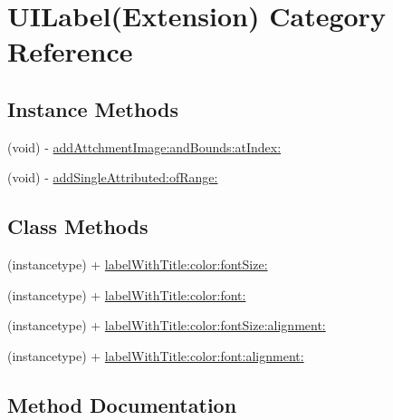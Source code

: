 \hypertarget{category_u_i_label_07_extension_08}{}\section{U\+I\+Label(Extension) Category Reference}
\label{category_u_i_label_07_extension_08}
\subsection*{Instance Methods}
\begin{DoxyCompactItemize}
\item 
(void) -\/ \mbox{\hyperlink{category_u_i_label_07_extension_08_a89c0591e6870f82316fc9ab7bcca537c}{add\+Attchment\+Image\+:and\+Bounds\+:at\+Index\+:}}
\item 
(void) -\/ \mbox{\hyperlink{category_u_i_label_07_extension_08_a24c98d97089aa3b852bb75a6cd16b880}{add\+Single\+Attributed\+:of\+Range\+:}}
\end{DoxyCompactItemize}
\subsection*{Class Methods}
\begin{DoxyCompactItemize}
\item 
(instancetype) + \mbox{\hyperlink{category_u_i_label_07_extension_08_a7b59b2dc75adec38797415e57daef294}{label\+With\+Title\+:color\+:font\+Size\+:}}
\item 
(instancetype) + \mbox{\hyperlink{category_u_i_label_07_extension_08_a844adb97a505eb02800e6fb5f55cfa0a}{label\+With\+Title\+:color\+:font\+:}}
\item 
(instancetype) + \mbox{\hyperlink{category_u_i_label_07_extension_08_a89be0450b71f6210d0df815907185b90}{label\+With\+Title\+:color\+:font\+Size\+:alignment\+:}}
\item 
(instancetype) + \mbox{\hyperlink{category_u_i_label_07_extension_08_a6776ee3e48fe423916d0469cc0647ef7}{label\+With\+Title\+:color\+:font\+:alignment\+:}}
\end{DoxyCompactItemize}


\subsection{Method Documentation}
\mbox{\label{category_u_i_label_07_extension_08_a89c0591e6870f82316fc9ab7bcca537c}} 
